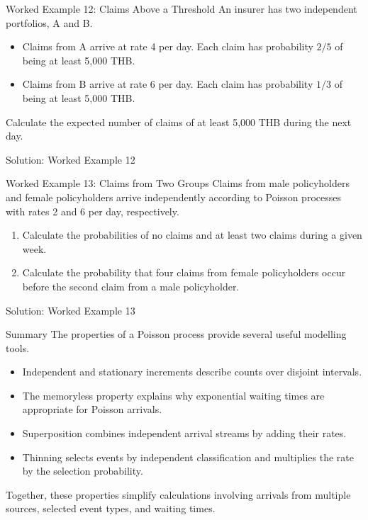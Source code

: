 \documentclass[
  ignorenonframetext,
  aspectratio=169,
]{beamer}
\providecommand{\tightlist}{%
  \setlength{\itemsep}{0pt}\setlength{\parskip}{0pt}}
\begin{document}
\begin{frame}{Worked Example 12: Claims Above a Threshold}
\protect{}\label{worked-example-12-claims-above-a-threshold}
An insurer has two independent portfolios, A and B.

\begin{itemize}
\tightlist
\item
  Claims from A arrive at rate 4 per day. Each claim has probability
  \(2/5\) of being at least 5,000 THB.
\item
  Claims from B arrive at rate 6 per day. Each claim has probability
  \(1/3\) of being at least 5,000 THB.
\end{itemize}

Calculate the expected number of claims of at least 5,000 THB during the
next day.
\end{frame}

\begin{frame}{Solution: Worked Example 12}
\protect{}\label{solution-worked-example-12}
\end{frame}

\begin{frame}{Worked Example 13: Claims from Two Groups}
\protect{}\label{worked-example-13-claims-from-two-groups}
Claims from male policyholders and female policyholders arrive
independently according to Poisson processes with rates 2 and 6 per day,
respectively.

\begin{enumerate}
\tightlist
\item
  Calculate the probabilities of no claims and at least two claims
  during a given week.
\item
  Calculate the probability that four claims from female policyholders
  occur before the second claim from a male policyholder.
\end{enumerate}
\end{frame}

\begin{frame}{Solution: Worked Example 13}
\protect{}\label{solution-worked-example-13}
\end{frame}

\begin{frame}{Summary}
\protect{}\label{summary-1}
The properties of a Poisson process provide several useful modelling
tools.

\begin{itemize}
\tightlist
\item
  Independent and stationary increments describe counts over disjoint
  intervals.
\item
  The memoryless property explains why exponential waiting times are
  appropriate for Poisson arrivals.
\item
  Superposition combines independent arrival streams by adding their
  rates.
\item
  Thinning selects events by independent classification and multiplies
  the rate by the selection probability.
\end{itemize}

Together, these properties simplify calculations involving arrivals from
multiple sources, selected event types, and waiting times.
\end{frame}
\end{document}
